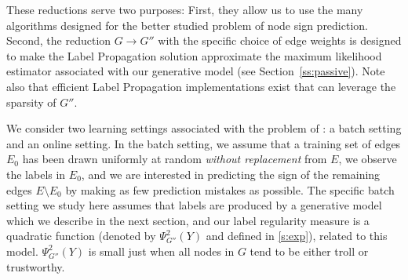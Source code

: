 \iffalse
  While we could make this
argument more quantitative, here we simply observe that if each node in $G$ tends to be either
troll or trustworthy, then few labels from the incoming and outgoing edges of each such node are
sufficient to predict the labels on the remaining edges in $G$, and this translates to a small
cutsize\footnote{Recall that the cutsize of an undirected node-labeled graph $G'(Y)$ is the number
of edges in $G'$ connecting nodes having mismatching labels.} of $G'(Y)$ over the nodes
corresponding to the edges in $G$ (the colored squares in \autoref{fig:troll_reduction_gprime}).
\fi

These reductions serve two purposes: First, they allow us to
use the many algorithms designed for the better studied problem of node sign prediction. Second,
the reduction $G\rightarrow G''$ with the specific choice of edge weights is designed to make the
Label Propagation solution approximate the maximum likelihood estimator associated with our
generative model (see Section~\ref{ss:passive}). Note also that efficient Label Propagation
implementations exist that can leverage the sparsity of $G''$.

\bigskip

We consider two learning settings associated with the problem of \esp{}: a batch
setting and an online setting. In the batch setting, we assume that a training set
of edges $E_0$ has been drawn uniformly at random \emph{without replacement} from $E$, we observe
the labels in $E_0$, and we are interested in predicting the sign of the remaining edges $E
\setminus E_0$ by making as few prediction mistakes as possible.
The specific batch setting
we study here assumes that labels are produced by a
generative model which we describe in the next section, and our label regularity measure is a
quadratic function (denoted by $\Psi^2_{G''}(Y)$ and defined in \autoref{s:exp}), related to this
model. $\Psi^2_{G''}(Y)$ is small just when all nodes in $G$ tend to be either troll or
trustworthy. 

